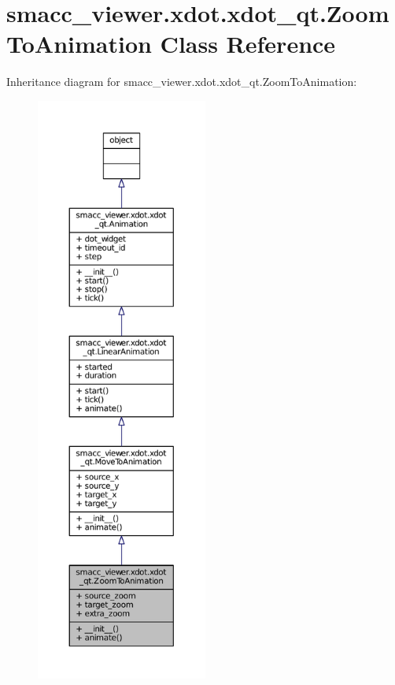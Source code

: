 \hypertarget{classsmacc__viewer_1_1xdot_1_1xdot__qt_1_1ZoomToAnimation}{}\section{smacc\+\_\+viewer.\+xdot.\+xdot\+\_\+qt.\+Zoom\+To\+Animation Class Reference}
\label{classsmacc__viewer_1_1xdot_1_1xdot__qt_1_1ZoomToAnimation}


Inheritance diagram for smacc\+\_\+viewer.\+xdot.\+xdot\+\_\+qt.\+Zoom\+To\+Animation\+:
\nopagebreak
\begin{figure}[H]
\begin{center}
\leavevmode
\includegraphics[height=550pt]{classsmacc__viewer_1_1xdot_1_1xdot__qt_1_1ZoomToAnimation__inherit__graph}
\end{center}
\end{figure}


